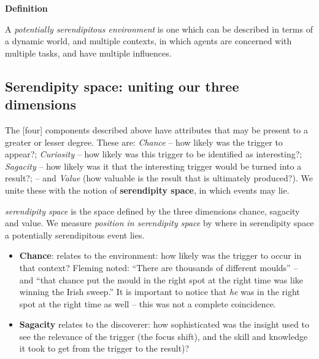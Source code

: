\begin{mdframed}
{\bf Definition}

A {\em potentially serendipitous environment} is one which can be
described in terms of a dynamic world, and multiple contexts, in which
agents are concerned with multiple tasks, and have multiple
influences.
\end{mdframed}


\subsection{Serendipity space: uniting our three dimensions}

The [four] components described above have attributes that may be
present to a greater or lesser degree.  These are: \emph{Chance} --
how likely was the trigger to appear?; \emph{Curiosity} -- how likely
was this trigger to be identified as interesting?; \emph{Sagacity} --
how likely was it that the interesting trigger would be turned into a
result?; -- and \emph{Value} (how valuable is the result that is
ultimately produced?). We unite these with the notion of {\bf
  serendipity space}, in which events may lie.

{\em serendipity space} is the space defined by the three dimensions
chance, sagacity and value. We measure {\em position in serendipity
  space} by where in serendipity space a potentially serendipitous
event lies.


\begin{itemize}
\item \textbf{Chance}: relates to the environment: how likely was the
  trigger to occur in that context? Fleming \cite{fleming} noted:
  ``There are thousands of different moulds'' -- and ``that chance put
  the mould in the right spot at the right time was like winning the
  Irish sweep.''  It is important to notice that \emph{he} was in the
  right spot at the right time as well -- this was not a complete
  coincidence.
\end{itemize}

\begin{itemize}
\item \textbf{Sagacity} relates to the discoverer: how sophisticated
  was the insight used to see the relevance of the trigger (the focus
  shift), and the skill and knowledge it took to get from the trigger
  to the result)?
\end{itemize}


